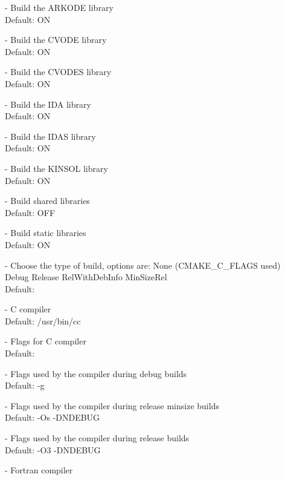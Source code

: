 \begin{description}
\item[] - 
  Build the ARKODE library 
  \\
  Default: ON
\item[] - 
  Build the CVODE library 
  \\
  Default: ON
\item[] - 
  Build the CVODES library 
  \\
  Default: ON
\item[] - 
   Build the IDA library 
  \\
   Default: ON
\item[] - 
  Build the IDAS library 
  \\
  Default: ON
\item[] - 
  Build the KINSOL library 
  \\
  Default: ON
\item[] - 
  Build shared libraries
  \\
  Default: OFF 
\item[] - 
  Build static libraries
  \\
  Default: ON 
\item[] -  
  Choose the type of build, options are: 
  None (CMAKE\_C\_FLAGS used) Debug Release RelWithDebInfo MinSizeRel
  \\
  Default:
\item[] - 
  C compiler
  \\
  Default: /usr/bin/cc 
\item[] -  
  Flags for C compiler
  \\
  Default:
\item[] -      
  Flags used by the compiler during debug builds
  \\
  Default: -g 
\item[] -  
  Flags used by the compiler during release minsize builds
  \\
  Default: -Os -DNDEBUG 
\item[] -    
  Flags used by the compiler during release builds
  \\
  Default: -O3 -DNDEBUG 
\item[] - 
  Fortran compiler
  \\

\end{description}
